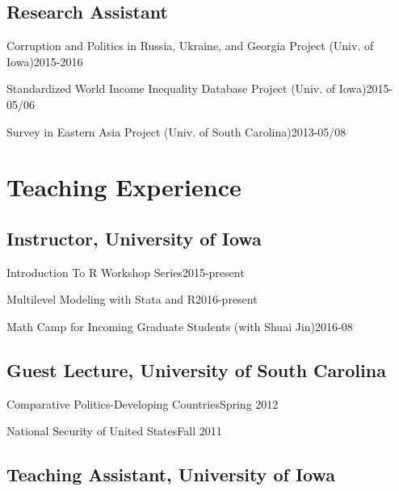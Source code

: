 \documentclass[10.5pt,]{article}
\providecommand{\tightlist}{%
  \setlength{\itemsep}{0pt}\setlength{\parskip}{0pt}}
\renewenvironment{itemize}{
  \begin{list}{}{
    \setlength{\leftmargin}{1.5em}
  }
}{
  \end{list}
}
\begin{document}
\subsection{Research Assistant}\label{research-assistant}

\begin{itemize}
\tightlist
\item
  Corruption and Politics in Russia, Ukraine, and Georgia Project (Univ.
  of Iowa)\hfill 2015-2016
\item
  Standardized World Income Inequality Database Project (Univ. of
  Iowa)\hfill 2015-05/06
\item
  Survey in Eastern Asia Project (Univ. of South
  Carolina)\hfill 2013-05/08
\end{itemize}

\section{Teaching Experience}\label{teaching-experience}

\subsection{Instructor, University of
Iowa}\label{instructor-university-of-iowa}

\begin{itemize}
\tightlist
\item
  Introduction To R Workshop Series\hfill 2015-present
\item
  Multilevel Modeling with Stata and R\hfill 2016-present
\item
  Math Camp for Incoming Graduate Students (with Shuai
  Jin)\hfill 2016-08
\end{itemize}

\subsection{Guest Lecture, University of South
Carolina}\label{guest-lecture-university-of-south-carolina}

\begin{itemize}
\tightlist
\item
  Comparative Politics-Developing Countries\hfill Spring 2012
\item
  National Security of United States\hfill Fall 2011
\end{itemize}

\subsection{Teaching Assistant, University of
Iowa}\label{teaching-assistant-university-of-iowa}
\end{document}
